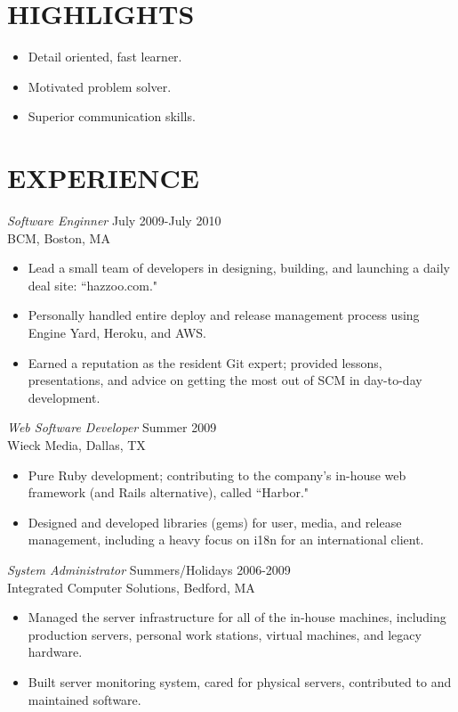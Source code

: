 \documentclass[line,margin]{res}
\begin{document}
 
\address{\,\,\,\,\,\,\,\,\,\,\, dana.merrick@gmail.com}
\address{Brookline, MA -- 978.206.1331}
 
\begin{resume}

\section{HIGHLIGHTS}
	\begin{itemize}  \itemsep -2pt %
		\item Detail oriented, fast learner.
		\item Motivated problem solver.
		\item Superior communication skills.
	\end{itemize}

\section{EXPERIENCE}
	{\sl Software Enginner} \hfill July 2009-July 2010 \\
	BCM, 
	Boston, MA
	\begin{itemize}  \itemsep -2pt %
		\item Lead a small team of developers in designing, building, and launching a daily deal site: ``hazzoo.com."
		\item Personally handled entire deploy and release management process using Engine Yard, Heroku, and AWS.
		\item Earned a reputation as the resident Git expert; provided lessons, presentations, and advice on getting the most out of SCM in day-to-day development.
	\end{itemize}

	{\sl Web Software Developer} \hfill Summer 2009 \\
	Wieck Media, 
	Dallas, TX
	\begin{itemize}  \itemsep -2pt %
		\item Pure Ruby development; contributing to the company's in-house web framework (and Rails alternative), called ``Harbor."
		\item Designed and developed libraries (gems) for user, media, and release management, including a heavy focus on i18n for an international client.
	\end{itemize}
 
	{\sl System Administrator} \hfill            Summers/Holidays 2006-2009 \\
	Integrated Computer Solutions,
	Bedford, MA
	\begin{itemize}  \itemsep -2pt %
		\item Managed the server infrastructure for all of the in-house machines, including production servers, personal work stations, virtual machines, and legacy hardware.
		\item Built server monitoring system, cared for physical servers, contributed to and maintained software.
	\end{itemize} 


\end{resume}
\end{document}
